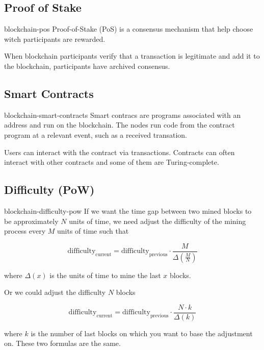 \documentclass[preview]{standalone}
\begin{document}
\subsection{Proof of Stake}

\begin{snippet}{blockchain-pos}
    Proof-of-Stake (PoS) is a consensus mechanism that help choose witch participants
    are rewarded.

    When blockchain participants verify that a transaction is legitimate and add it
    to the blockchain, participants have archived consensus.
\end{snippet}

\subsection{Smart Contracts}

\begin{snippet}{blockchain-smart-contracts}
Smart contracs are programs associated with an address and run on the blockchain.
The nodes run code from the contract program at a relevant event, such as a received transation.

Users can interact with the contract via transactions. Contracts can often interact with other contracts
and some of them are Turing-complete.
\end{snippet}

%
%

\subsection{Difficulty (PoW)}

\begin{snippet}{blockchain-difficulty-pow}
If we want the time gap between two mined blocks to be approximately
\(N\) units of time, we need adjust the difficulty of the mining process every 
\(M\) units of time such that

\[
    \text{difficulty}_\text{current} =
    \text{difficulty}_\text{previous}
    \cdot \frac{M}{\Delta (\frac{M}{N})}
\]

where \(\Delta (x)\) is the units of time to mine the last \(x\) blocks.

Or we could adjust the difficulty \(N\) blocks

\[
    \text{difficulty}_\text{current} =
    \text{difficulty}_\text{previous}
    \cdot \frac{N \cdot k}{\Delta(k)}
\]

where \(k\) is the number of last blocks on which you want to
base the adjustment on. These two formulas are the same.
\end{snippet}
\end{document}
